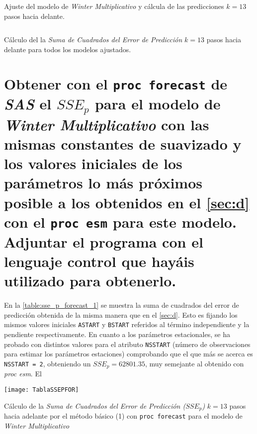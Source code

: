 \documentclass[a4paper, spanish]{article}
\begin{document}
    \begin{listing}[htb!]
      \centering
      \inputminted{SAS}{./res/code/d-02-prediction-error-esm-wintermul.sas}
      \caption{Ajuste del modelo de \emph{Winter Multiplicativo} y cálcula de las predicciones $k = 13$ pasos hacia delante.}
      \label{code:d_prediction_error_esm_wintermul}
    \end{listing}

    \begin{listing}[htb!]
      \centering
      \inputminted{SAS}{./res/code/d-03-error-summary.sas}
      \caption{Cálculo del la \emph{Suma de Cuadrados del Error de Predicción} $k = 13$ pasos hacia delante para todos los modelos ajustados.}
      \label{code:d_summary_error}
    \end{listing}

  \section{Obtener con el \texttt{proc forecast} de \emph{SAS} el $SSE_p$ para el modelo de \emph{Winter Multiplicativo} con las mismas constantes de suavizado y los valores iniciales de los parámetros lo más próximos posible a los obtenidos en el \autoref{sec:d} con el \texttt{proc esm} para este modelo. Adjuntar el programa con el lenguaje control que hayáis utilizado para obtenerlo.}
  \label{sec:e}

    \paragraph{}
    En la \autoref{table:sse_p_forecast_1} se muestra la suma de cuadrados del error de predicción obtenida de la misma manera que en el \autoref{sec:d}. Esto es fijando los mismos valores iniciales \texttt{ASTART} y \texttt{BSTART} referidos al término independiente y la pendiente respectivamente. En cuanto a los parámetros estacionales, se ha probado con distintos valores para el atributo \texttt{NSSTART} (número de observaciones para estimar los parámetros estaciones) comprobando que el que más se acerca es \texttt{NSSTART = 2}, obteniendo un $SSE_p = 62801.35$, muy semejante al obtenido con \textit{proc esm}. El

    \begin{table}[htb!]
      \centering
      \texttt{[image: TablaSSEPFOR]}
      \caption{Cálculo de la \emph{Suma de Cuadrados del Error de Predicción ($SSE_p$)} $k = 13$ pasos hacia adelante por el método básico (1) con \texttt{proc forecast} para el modelo de \emph{Winter Multiplicativo}}
      \label{table:sse_p_forecast_1}
    \end{table}
\end{document}
